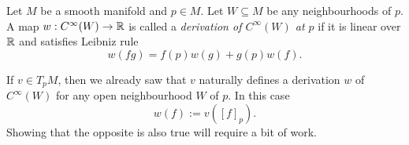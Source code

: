 \begin{definition}
  Let $M$ be a smooth manifold and $p\in M$.
  Let $W\subseteq M$ be any neighbourhoods of $p$.
  A map $w:C^\infty(W)\to\mathbb{R}$ is called a \emph{derivation of $C^\infty(W)$ at $p$} if it is linear over $\mathbb{R}$ and satisfies Leibniz rule
  \begin{equation}
    w(fg) = f(p)w(g) + g(p)w(f).
  \end{equation}
\end{definition}

If $v\in T_p M$, then we already saw that $v$ naturally defines a derivation $w$ of $C^\infty(W)$ for any open neighbourhood $W$ of $p$.
In this case
\begin{equation}\label{eq:derivfromtg}
  w(f) := v([f]_p).
\end{equation}
Showing that the opposite is also true will require a bit of work.

